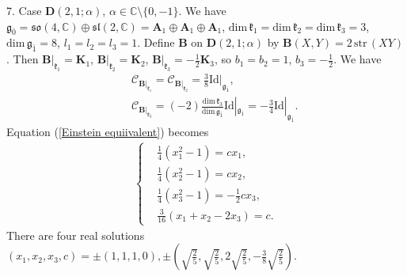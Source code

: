 \documentclass[reqno]{amsart}
\theoremstyle{definition}
\begin{document}
7. Case $\mathbf{D}(2,1;\alpha)$,  $\alpha\in \mathbb{C}\setminus\{0,-1\}$.
We have
$\mathfrak{g}_{\bar{0}}=\mathfrak{so}(4,\mathbb{C})\oplus \mathfrak{sl}(2,\mathbb{C})=\mathbf{A}_{1}\oplus \mathbf{A}_{1}\oplus \mathbf{A}_{1}$, $\mathrm{dim}\,\mathfrak{k}_{1}=\mathrm{dim}\,\mathfrak{k}_{2}=\mathrm{dim}\,\mathfrak{k}_{3}=3$, $\mathrm{dim}\,\mathfrak{g}_{\bar{1}}=8$, $l_{1}=l_{2}=l_{3}=1$.
Define $\mathbf{B}$  on $\mathbf{D}(2,1;\alpha)$ by  $\mathbf{B}(X,Y)=2\,\mathrm{str}\,(XY)$.
 Then $\mathbf{B}|_{\mathfrak{k}_{1}}=\mathbf{K}_{1}$, $\mathbf{B}|_{\mathfrak{k}_{2}}=\mathbf{K}_{2}$, $\mathbf{B}|_{\mathfrak{k}_{3}}=-\frac{1}{2}\mathbf{K}_{3}$, so $b_{1}=b_{2}=1$, $b_{3}=-\frac{1}{2}$. We have
\begin{eqnarray*}
&&\mathcal{C}_{\mathbf{B}|_{\mathfrak{k}_{1}}}=\mathcal{C}_{\mathbf{B}|_{\mathfrak{k}_{2}}}=\frac{3}{8}\mathrm{Id}|_{\mathfrak{g}_{\bar{1}}},\\
&&\mathcal{C}_{\mathbf{B}|_{\mathfrak{k}_{3}}}=(-2)\frac{\mathrm{dim}\,\mathfrak{k}_{3}}{\mathrm{dim}\,\mathfrak{g}_{\bar{1}}}\mathrm{Id}|_{\mathfrak{g}_{\bar{1}}}
                                              =-\frac{3}{4}\mathrm{Id}|_{\mathfrak{g}_{\bar{1}}}.
\end{eqnarray*}
Equation (\ref{Einstein equiivalent}) becomes
\begin{eqnarray*}
\left\{
\begin{aligned}
&\frac{1}{4}(x_{1}^{2}-1)=c x_{1},\\
&\frac{1}{4}(x_{2}^{2}-1)=c x_{2},\\
&\frac{1}{4}(x_{3}^{2}-1)=-\frac{1}{2}c x_{3},\\
&\frac{3}{16}(x_{1}+x_{2}-2x_{3})=c.
\end{aligned}\right.
\end{eqnarray*}
There are four real solutions
$(x_{1},x_{2},x_{3},c)=\pm(1,1,1,0), \pm\left(\sqrt{\frac{2}{5}},\sqrt{\frac{2}{5}},2\sqrt{\frac{2}{5}},-\frac{3}{8}\sqrt{\frac{2}{5}}\right).$
\end{document}
